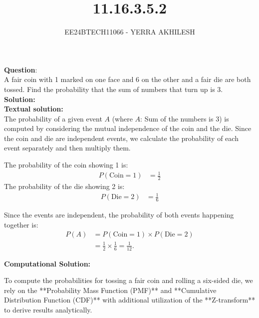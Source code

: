 \documentclass[journal]{IEEEtran}
\begin{document}

\vspace{3cm}

\title{11.16.3.5.2}
\author{EE24BTECH11066 - YERRA AKHILESH}
{\let\newpage\relax\maketitle}

\renewcommand{\thefigure}{\theenumi}
\renewcommand{\thetable}{\theenumi}
\setlength{\intextsep}{10pt} %

\renewcommand{\thetable}{\theenumi}

\textbf{Question}:\\ 

A fair coin with 1 marked on one face and 6 on the other and a fair die are both tossed. Find the probability that the sum of numbers that turn up is 3.\\

\textbf{Solution: }\\
\textbf{Textual solution: }\\
The probability of a given event $A$ (where $A$: Sum of the numbers is 3) is computed by considering the mutual independence of the coin and the die. Since the coin and die are independent events, we calculate the probability of each event separately and then multiply them.

The probability of the coin showing 1 is:
\begin{align}
P(\text{Coin} = 1) &= \frac{1}{2}
\end{align}
The probability of the die showing 2 is:
\begin{align}
P(\text{Die} = 2) &= \frac{1}{6}
\end{align}

Since the events are independent, the probability of both events happening together is:
\begin{align}
P(A) &= P(\text{Coin} = 1) \times P(\text{Die} = 2) \\
     &= \frac{1}{2} \times \frac{1}{6} = \frac{1}{12}.
\end{align}

\textbf{Computational Solution:}


To compute the probabilities for tossing a fair coin and rolling a six-sided die, we rely on the **Probability Mass Function (PMF)** and **Cumulative Distribution Function (CDF)** with additional utilization of the **Z-transform** to derive results analytically.
\end{document}
